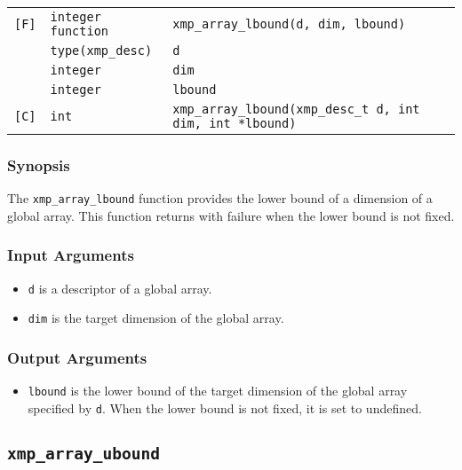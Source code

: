 \begin{tabular}{lll}

\verb![F]!& {\tt integer function}& {\tt xmp\_array\_lbound(d, dim, lbound)}\\
          & {\tt type(xmp\_desc)} & {\tt d}\\
          & {\tt integer} & {\tt dim}\\
          & {\tt integer} & {\tt lbound}\\

\verb![C]!&  {\tt int}& {\tt xmp\_array\_lbound(xmp\_desc\_t d, int dim, int *lbound)}\\

\end{tabular}

\subsubsection*{Synopsis}

The {\tt xmp\_array\_lbound} function provides the lower bound of a
dimension of a global array. This function returns with failure when the
lower bound is not fixed.

\subsubsection*{Input Arguments}
\begin{itemize}
 \item {\tt d} is a descriptor of a global array.
 \item {\tt dim} is the target dimension of the global array.
\end{itemize}

\subsubsection*{Output Arguments}
\begin{itemize}
 \item {\tt lbound} is the lower bound of the target dimension of the
       global array specified by {\tt d}. When the lower bound is not
       fixed, it is set to undefined.
\end{itemize}


\subsection{\tt xmp\_array\_ubound}

